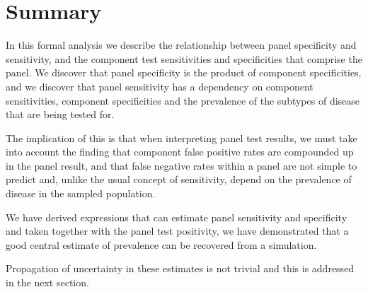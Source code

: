 \documentclass[a4paper, 12pt, twoside]{article}
\let\Oldsection\section
\renewcommand{\section}{\FloatBarrier\Oldsection}
\begin{document}
\section{Summary}

In this formal analysis we describe the relationship between panel specificity and sensitivity, and the component test sensitivities and specificities that comprise the panel. We discover that panel specificity is the product of component specificities, and we discover that panel sensitivity has a dependency on component sensitivities, component specificities and the prevalence of the subtypes of disease that are being tested for.

The implication of this is that when interpreting panel test results, we must take into account the finding that component false positive rates are compounded up in the panel result, and that false negative rates within a panel are not simple to predict and, unlike the usual concept of sensitivity, depend on the prevalence of disease in the sampled population.

We have derived expressions that can estimate panel sensitivity and specificity and taken together with the panel test positivity, we have demonstrated that a good central estimate of prevalence can be recovered from a simulation.

Propagation of uncertainty in these estimates is not trivial and this is addressed in the next section.




\end{document}
